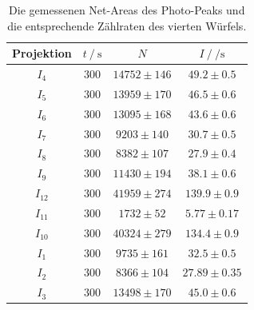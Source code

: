 \begin{table}[H]
  \centering
  \begin{tabular}{c c c c}
    \toprule
    Projektion &  $t \:/\: \si{\second}$ &     $N$ &           $I \:/\: \si{\per\second}$ \\
    \midrule
        $I_{  4}$ &   $300$ & $14752 \pm     146$ & $  49.2\pm0.5$ \\
        $I_{  5}$ &   $300$ & $13959 \pm     170$ & $  46.5\pm0.6$ \\
        $I_{  6}$ &   $300$ & $13095 \pm     168$ & $  43.6\pm0.6$ \\
        $I_{  7}$ &   $300$ & $ 9203 \pm     140$ & $  30.7\pm0.5$ \\
        $I_{  8}$ &   $300$ & $ 8382 \pm     107$ & $  27.9\pm0.4$ \\
        $I_{  9}$ &   $300$ & $11430 \pm     194$ & $  38.1\pm0.6$ \\
        $I_{ 12}$ &   $300$ & $41959 \pm     274$ & $ 139.9\pm0.9$ \\
        $I_{ 11}$ &   $300$ & $ 1732 \pm      52$ & $  5.77\pm0.17$ \\
        $I_{ 10}$ &   $300$ & $40324 \pm     279$ & $ 134.4\pm0.9$ \\
        $I_{  1}$ &   $300$ & $ 9735 \pm     161$ & $  32.5\pm0.5$ \\
        $I_{  2}$ &   $300$ & $ 8366 \pm     104$ & $ 27.89\pm0.35$ \\
        $I_{  3}$ &   $300$ & $13498 \pm     170$ & $  45.0\pm0.6$ \\
      \bottomrule
  \end{tabular}
  \caption{Die gemessenen Net-Areas des Photo-Peaks und die entsprechende Zählraten des vierten Würfels. }
  \label{tab:w4}
\end{table}